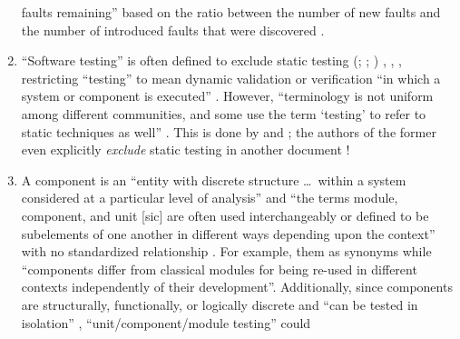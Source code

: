 \begin{enumerate}
          faults remaining'' \citep[p.~165]{IEEE2017} based on the ratio
          between the number of new faults and the number of introduced faults
          that were discovered \citep[p.~427]{vanVliet2000}.
    \item %
          ``Software testing'' is often defined to exclude static testing
          \ifnotpaper
              (\citealp[p.~13]{Firesmith2015}; \citealp[p.~222]{AmmannAndOffutt2017};
              \citealp[p.~439]{PetersAndPedrycz2000})%
          \else
              \cite[p.~439]{PetersAndPedrycz2000}, \cite[p.~13]{Firesmith2015},
              \cite[p.~222]{AmmannAndOffutt2017}%
          \fi, restricting ``testing'' to mean dynamic validation
          \citep[p.~5\=/1]{SWEBOK2024} or verification ``in which a system or
          component is executed'' \citep[p.~427]{IEEE2017}. However,
          ``terminology is not uniform among different communities, and some
          use the term `testing' to refer to static techniques%
           as well'' \citep[p.~5\=/2]{SWEBOK2024}.
          This is done by \citet[pp.~16\==17]{IEEE2022} and
          \citet[pp.~8\==9]{Gerrard2000a}; the \ifnotpaper \else authors of the
          \fi former even explicitly \emph{exclude} static testing in another
          document \citeyearpar[p.~440]{IEEE2017}!
    \item %
          A component is an ``entity with discrete structure \dots\ within a
          system considered at a particular level of analysis''
          \citep{ISO_IEC2023b} and ``the terms module, component, and unit
              [sic] are often used interchangeably or defined to be subelements
          of one another in different ways depending upon the context'' with
          no standardized relationship \citep[p.~82]{IEEE2017}. For example,
          \citetISTQB{}  them as synonyms while
          \citet[p.~107]{BaresiAndPezzè2006}  ``components
          differ from classical modules for being re-used in different contexts
          independently of their development''.
          Additionally, since components are structurally, functionally, or
          logically discrete \citep[p.~419]{IEEE2017} and ``can be tested in
          isolation'' \citepISTQB{}, ``unit/component/module testing'' could

\end{enumerate}
